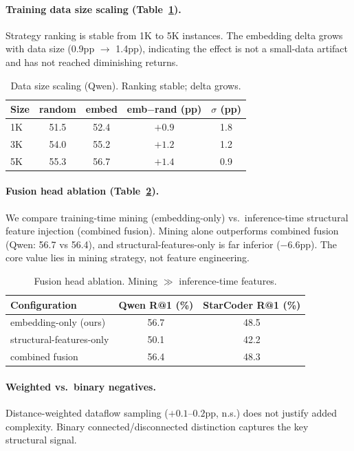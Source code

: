 \documentclass[11pt,a4paper]{article}
\begin{document}
\paragraph{Training data size scaling (Table~\ref{tab:scaling}).} Strategy ranking is stable from 1K to 5K instances. The embedding delta grows with data size (0.9pp $\to$ 1.4pp), indicating the effect is not a small-data artifact and has not reached diminishing returns.

\begin{table}[t]
\centering
\small
\caption{Data size scaling (Qwen). Ranking stable; delta grows.}
\label{tab:scaling}
\begin{tabular}{lcccc}
\toprule
Size & random & embed & emb$-$rand (pp) & $\sigma$ (pp) \\
\midrule
1K & 51.5 & 52.4 & $+0.9$ & 1.8 \\
3K & 54.0 & 55.2 & $+1.2$ & 1.2 \\
5K & 55.3 & 56.7 & $+1.4$ & 0.9 \\
\bottomrule
\end{tabular}
\end{table}

\paragraph{Fusion head ablation (Table~\ref{tab:fusion}).} We compare training-time mining (embedding-only) vs.\ inference-time structural feature injection (combined fusion). Mining alone outperforms combined fusion (Qwen: 56.7 vs 56.4), and structural-features-only is far inferior ($-6.6$pp). The core value lies in mining strategy, not feature engineering.

\begin{table}[t]
\centering
\small
\caption{Fusion head ablation. Mining $\gg$ inference-time features.}
\label{tab:fusion}
\begin{tabular}{lcc}
\toprule
Configuration & Qwen R@1 (\%) & StarCoder R@1 (\%) \\
\midrule
embedding-only (ours) & 56.7 & 48.5 \\
structural-features-only & 50.1 & 42.2 \\
combined fusion & 56.4 & 48.3 \\
\bottomrule
\end{tabular}
\end{table}

\paragraph{Weighted vs.\ binary negatives.} Distance-weighted dataflow sampling ($+0.1$--$0.2$pp, n.s.) does not justify added complexity. Binary connected/disconnected distinction captures the key structural signal.
\end{document}
